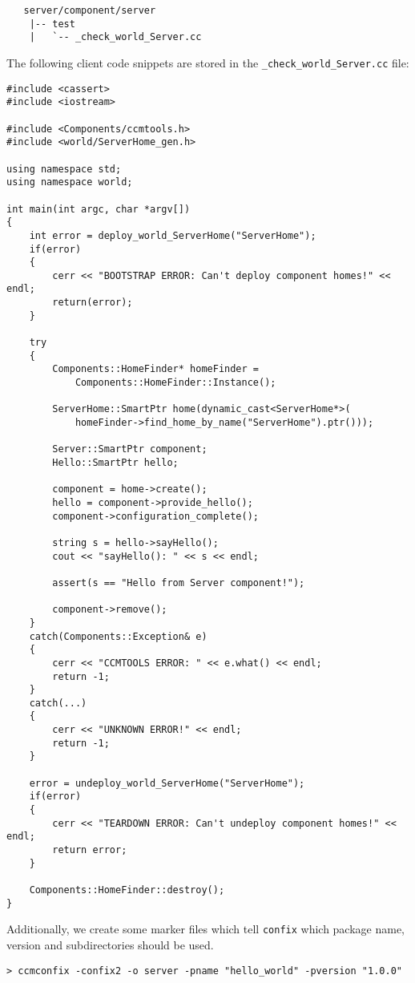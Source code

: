 \begin{small}
\begin{verbatim}
   server/component/server
    |-- test
    |   `-- _check_world_Server.cc
\end{verbatim}
\end{small}

\noindent
The following client code snippets are stored in the 
{\tt \_check\_world\_Server.cc} file:
\begin{small}
\begin{verbatim}
#include <cassert>
#include <iostream>

#include <Components/ccmtools.h>
#include <world/ServerHome_gen.h>

using namespace std;
using namespace world;

int main(int argc, char *argv[])
{
    int error = deploy_world_ServerHome("ServerHome");
    if(error)
    {
        cerr << "BOOTSTRAP ERROR: Can't deploy component homes!" << endl;
        return(error);
    }

    try
    {
        Components::HomeFinder* homeFinder = 
            Components::HomeFinder::Instance();

        ServerHome::SmartPtr home(dynamic_cast<ServerHome*>(
            homeFinder->find_home_by_name("ServerHome").ptr()));

        Server::SmartPtr component;
        Hello::SmartPtr hello;

        component = home->create();
        hello = component->provide_hello();
        component->configuration_complete();

        string s = hello->sayHello();
        cout << "sayHello(): " << s << endl;

        assert(s == "Hello from Server component!");

        component->remove();
    }
    catch(Components::Exception& e)
    {
        cerr << "CCMTOOLS ERROR: " << e.what() << endl;
        return -1;
    }
    catch(...)
    {
        cerr << "UNKNOWN ERROR!" << endl;
        return -1;
    }

    error = undeploy_world_ServerHome("ServerHome");
    if(error)
    {
        cerr << "TEARDOWN ERROR: Can't undeploy component homes!" << endl;
        return error;
    }

    Components::HomeFinder::destroy();
}
\end{verbatim}
\end{small}

\noindent
Additionally, we create some marker files which tell
{\tt confix} which package name, version and subdirectories
should be used.
\begin{small}
\begin{verbatim}
> ccmconfix -confix2 -o server -pname "hello_world" -pversion "1.0.0"
\end{verbatim}
\end{small}

